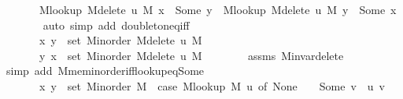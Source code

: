\begin{isabellebody}
\ \ \ \ \ \ \ M{\isacharunderscore}{\kern0pt}lookup\ {\isacharparenleft}{\kern0pt}M{\isacharunderscore}{\kern0pt}delete\ u\ M{\isacharparenright}{\kern0pt}\ x\ {\isacharequal}{\kern0pt}\ Some\ y\ {\isasymor}\ M{\isacharunderscore}{\kern0pt}lookup\ {\isacharparenleft}{\kern0pt}M{\isacharunderscore}{\kern0pt}delete\ u\ M{\isacharparenright}{\kern0pt}\ y\ {\isacharequal}{\kern0pt}\ Some\ x{\isachardoublequoteclose}\isanewline
\ \ \ \ \ \ \isamarkupfalse%
\ {\isacharparenleft}{\kern0pt}auto\ simp\ add{\isacharcolon}{\kern0pt}\ doubleton{\isacharunderscore}{\kern0pt}eq{\isacharunderscore}{\kern0pt}iff{\isacharparenright}{\kern0pt}\isanewline
\ \ \ \ \isamarkupfalse%
\ \isamarkupfalse%
\isanewline
\ \ \ \ \ \ {\isachardoublequoteopen}{\isachardot}{\kern0pt}{\isachardot}{\kern0pt}{\isachardot}{\kern0pt}\ {\isasymlongleftrightarrow}\isanewline
\ \ \ \ \ \ \ {\isacharparenleft}{\kern0pt}x{\isacharcomma}{\kern0pt}\ y{\isacharparenright}{\kern0pt}\ {\isasymin}\ set\ {\isacharparenleft}{\kern0pt}M{\isacharunderscore}{\kern0pt}inorder\ {\isacharparenleft}{\kern0pt}M{\isacharunderscore}{\kern0pt}delete\ u\ M{\isacharparenright}{\kern0pt}{\isacharparenright}{\kern0pt}\ {\isasymor}\isanewline
\ \ \ \ \ \ \ {\isacharparenleft}{\kern0pt}y{\isacharcomma}{\kern0pt}\ x{\isacharparenright}{\kern0pt}\ {\isasymin}\ set\ {\isacharparenleft}{\kern0pt}M{\isacharunderscore}{\kern0pt}inorder\ {\isacharparenleft}{\kern0pt}M{\isacharunderscore}{\kern0pt}delete\ u\ M{\isacharparenright}{\kern0pt}{\isacharparenright}{\kern0pt}{\isachardoublequoteclose}\isanewline
\ \ \ \ \ \ \isamarkupfalse%
\ assms\ M{\isachardot}{\kern0pt}invar{\isacharunderscore}{\kern0pt}delete\isanewline
\ \ \ \ \ \ \isamarkupfalse%
\ {\isacharparenleft}{\kern0pt}simp\ add{\isacharcolon}{\kern0pt}\ M{\isachardot}{\kern0pt}mem{\isacharunderscore}{\kern0pt}inorder{\isacharunderscore}{\kern0pt}iff{\isacharunderscore}{\kern0pt}lookup{\isacharunderscore}{\kern0pt}eq{\isacharunderscore}{\kern0pt}Some{\isacharparenright}{\kern0pt}\isanewline
\ \ \ \ \isamarkupfalse%
\ \isamarkupfalse%
\isanewline
\ \ \ \ \ \ {\isachardoublequoteopen}{\isachardot}{\kern0pt}{\isachardot}{\kern0pt}{\isachardot}{\kern0pt}\ {\isasymlongleftrightarrow}\isanewline
\ \ \ \ \ \ \ {\isacharparenleft}{\kern0pt}x{\isacharcomma}{\kern0pt}\ y{\isacharparenright}{\kern0pt}\ {\isasymin}\ set\ {\isacharparenleft}{\kern0pt}M{\isacharunderscore}{\kern0pt}inorder\ M{\isacharparenright}{\kern0pt}\ {\isacharminus}{\kern0pt}\ {\isacharparenleft}{\kern0pt}case\ M{\isacharunderscore}{\kern0pt}lookup\ M\ u\ of\ None\ {\isasymRightarrow}\ {\isacharbraceleft}{\kern0pt}{\isacharbraceright}{\kern0pt}\ {\isacharbar}{\kern0pt}\ Some\ v\ {\isasymRightarrow}\ {\isacharbraceleft}{\kern0pt}{\isacharparenleft}{\kern0pt}u{\isacharcomma}{\kern0pt}\ v{\isacharparenright}{\kern0pt}{\isacharbraceright}{\kern0pt}{\isacharparenright}{\kern0pt}\ {\isasymor}\isanewline

\end{isabellebody}
